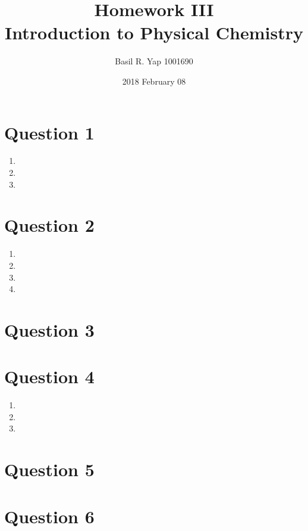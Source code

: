 \documentclass[a4paper, fleqn]{article}
\begin{document}
\title{Homework III \\ Introduction to Physical Chemistry}
\author{Basil R. Yap 1001690}
\date{2018 February 08}
\maketitle

\section{Question 1}

\begin{enumerate}[label=(\alph{*})]
\item 
\item 
\item 
\end{enumerate}

\section{Question 2}

\begin{enumerate}[label=(\alph{*})]
\item 
\item 
\item 
\item 
\end{enumerate}

\section{Question 3}

\section{Question 4}

\begin{enumerate}[label=(\alph{*})]
\item 
\item 
\item 
\end{enumerate}

\section{Question 5}

\section{Question 6}
\end{document}
